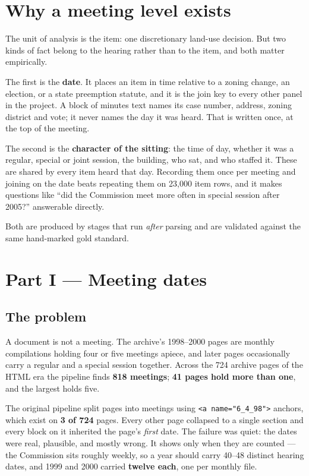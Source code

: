 \documentclass[11pt]{article}
\begin{document}
\section{Why a meeting level exists}

The unit of analysis is the item: one discretionary land-use decision. But two kinds of
fact belong to the hearing rather than to the item, and both matter empirically.

The first is the \textbf{date}. It places an item in time relative to a zoning change, an
election, or a state preemption statute, and it is the join key to every other panel in the
project. A block of minutes text names its case number, address, zoning district and vote;
it never names the day it was heard. That is written once, at the top of the meeting.

The second is the \textbf{character of the sitting}: the time of day, whether it was a
regular, special or joint session, the building, who sat, and who staffed it. These are
shared by every item heard that day. Recording them once per meeting and joining on the
date beats repeating them on 23{,}000 item rows, and it makes questions like ``did the
Commission meet more often in special session after 2005?'' answerable directly.

Both are produced by stages that run \emph{after} parsing and are validated against the
same hand-marked gold standard.

\section{Part I --- Meeting dates}

\subsection{The problem}

A document is not a meeting. The archive's 1998--2000 pages are monthly compilations
holding four or five meetings apiece, and later pages occasionally carry a regular and a
special session together. Across the 724 archive pages of the HTML era the pipeline finds
\textbf{818 meetings}; \textbf{41 pages hold more than one}, and the largest holds five.

The original pipeline split pages into meetings using \verb|<a name="6_4_98">| anchors,
which exist on \textbf{3 of 724} pages. Every other page collapsed to a single section and
every block on it inherited the page's \emph{first} date. The failure was quiet: the dates
were real, plausible, and mostly wrong. It shows only when they are counted --- the
Commission sits roughly weekly, so a year should carry 40--48 distinct hearing dates, and
1999 and 2000 carried \textbf{twelve each}, one per monthly file.
\end{document}
